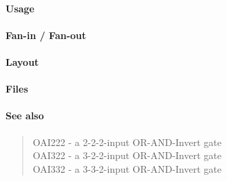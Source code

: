 \paragraph{Usage}

\paragraph{Fan-in / Fan-out}

\paragraph{Layout}

\paragraph{Files}

\paragraph{See also}
\begin{quote}
    OAI222 - a 2-2-2-input OR-AND-Invert gate \\
    OAI322 - a 3-2-2-input OR-AND-Invert gate \\
    OAI332 - a 3-3-2-input OR-AND-Invert gate
\end{quote}
